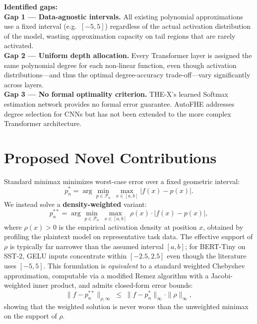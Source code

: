 \documentclass[12pt, a4paper]{article}
\begin{document}
\medskip
\noindent\textbf{Identified gaps:}\\[2pt]
\textbf{Gap 1 — Data-agnostic intervals.} All existing polynomial approximations use a fixed interval (e.g.\ $[-5, 5]$) regardless of the actual activation distribution of the model, wasting approximation capacity on tail regions that are rarely activated.\\[2pt]
\textbf{Gap 2 — Uniform depth allocation.} Every Transformer layer is assigned the same polynomial degree for each non-linear function, even though activation distributions—and thus the optimal degree-accuracy trade-off—vary significantly across layers.\\[2pt]
\textbf{Gap 3 — No formal optimality criterion.} THE-X's learned Softmax estimation network provides no formal error guarantee. AutoFHE addresses degree selection for CNNs but has not been extended to the more complex Transformer architecture.

\section{Proposed Novel Contributions}

\begin{contribution}
Standard minimax minimizes worst-case error over a fixed geometric interval:
\begin{equation}
  p_n^* = \arg\min_{p \in \mathcal{P}_n}\ \max_{x \in [a,b]} \bigl|f(x) - p(x)\bigr|.
  \label{eq:standard_minimax}
\end{equation}
We instead solve a \textbf{density-weighted} variant:
\begin{equation}
  p_n^{**} = \arg\min_{p \in \mathcal{P}_n}\ \max_{x \in [a,b]}\ \rho(x)\cdot\bigl|f(x) - p(x)\bigr|,
  \label{eq:weighted_minimax}
\end{equation}
where $\rho(x) > 0$ is the empirical activation density at position $x$, obtained by profiling the plaintext model on representative task data. The effective support of $\rho$ is typically far narrower than the assumed interval $[a,b]$; for BERT-Tiny on SST-2, GELU inputs concentrate within $[-2.5, 2.5]$ even though the literature uses $[-5, 5]$. This formulation is \emph{equivalent} to a standard weighted Chebyshev approximation, computable via a modified Remez algorithm with a Jacobi-weighted inner product, and admits closed-form error bounds:
\begin{equation}
  \bigl\|f - p_n^{**}\bigr\|_{\rho,\infty} \;\leq\; \bigl\|f - p_n^{*}\bigr\|_\infty \cdot \|\rho\|_\infty,
\end{equation}
showing that the weighted solution is never worse than the unweighted minimax on the support of $\rho$.
\end{contribution}
\end{document}

